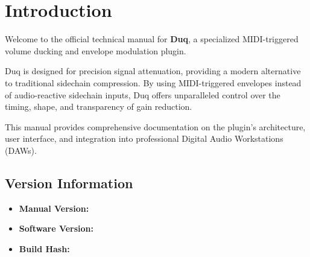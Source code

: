 \chapter{Introduction}
\label{ch:introduction}

Welcome to the official technical manual for \textbf{Duq}, a specialized MIDI-triggered volume ducking and envelope modulation plugin.

Duq is designed for precision signal attenuation, providing a modern alternative to traditional sidechain compression. By using MIDI-triggered envelopes instead of audio-reactive sidechain inputs, Duq offers unparalleled control over the timing, shape, and transparency of gain reduction.

This manual provides comprehensive documentation on the plugin's architecture, user interface, and integration into professional Digital Audio Workstations (DAWs).

\section{Version Information}
\begin{itemize}
    \item \textbf{Manual Version:} \manualversion
    \item \textbf{Software Version:} \softwareversion
    \item \textbf{Build Hash:} \gitcommit
\end{itemize}
